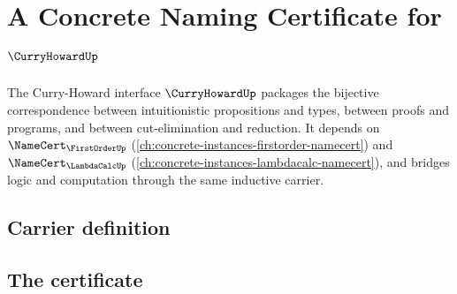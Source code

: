 \chapter{A Concrete Naming Certificate for $\CurryHowardUp$}
\label{ch:concrete-instances-curryhoward-namecert}

The Curry-Howard interface $\CurryHowardUp$ packages the bijective correspondence between intuitionistic propositions and types, between proofs and programs, and between cut-elimination and reduction. It depends on $\NameCert_{\FirstOrderUp}$ (\autoref{ch:concrete-instances-firstorder-namecert}) and $\NameCert_{\LambdaCalcUp}$ (\autoref{ch:concrete-instances-lambdacalc-namecert}), and bridges logic and computation through the same inductive carrier.

\section{Carrier definition}
\label{sec:curryhoward-carrier}

\section{The certificate}
\label{sec:curryhoward-certificate}

